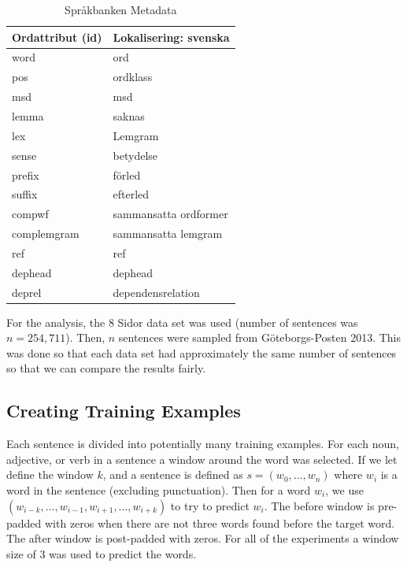 \documentclass[11pt,a4paper]{article}
\begin{document}
\begin{table}[h!]
\centering
\begin{tabular}{ll}
\hline
Ordattribut (id) & Lokalisering: svenska \\ \hline
word             & ord                   \\
pos              & ordklass              \\
msd              & msd                   \\
lemma            & saknas                \\
lex              & Lemgram               \\
sense            & betydelse             \\
prefix           & förled                \\
suffix           & efterled              \\
compwf           & sammansatta ordformer \\
complemgram      & sammansatta lemgram   \\
ref              & ref                   \\
dephead          & dephead               \\
deprel           & dependensrelation     \\ \hline
\end{tabular}
\caption{Språkbanken Metadata} \label{tab:spraakbankmeta}
\end{table}

For the analysis, the 8 Sidor data set was used (number of sentences was  $n = 254,711$).
Then, $n$ sentences were sampled from Göteborgs-Posten 2013.
This was done so that each data set had approximately the same number of sentences so that we can compare the results fairly.


\subsection{Creating Training Examples} \label{data_processing}
Each sentence is divided into potentially many training examples. 
For each noun, adjective, or verb in a sentence a window around the word was selected.
If we let define the window $k$, and a sentence is defined as $s = (w_0,\ldots, w_n)$ where $w_i$ is a word in the sentence (excluding punctuation).
Then for a word $w_i$, we use $(w_{i-k},\ldots,w_{i-1},w_{i+1},\ldots,w_{i + k})$ to try to predict $w_i$.
The before window is pre-padded with zeros when there are not three words found before the target word.
The after window is post-padded with zeros.
For all of the experiments a window size of 3 was used to predict the words.
\end{document}
